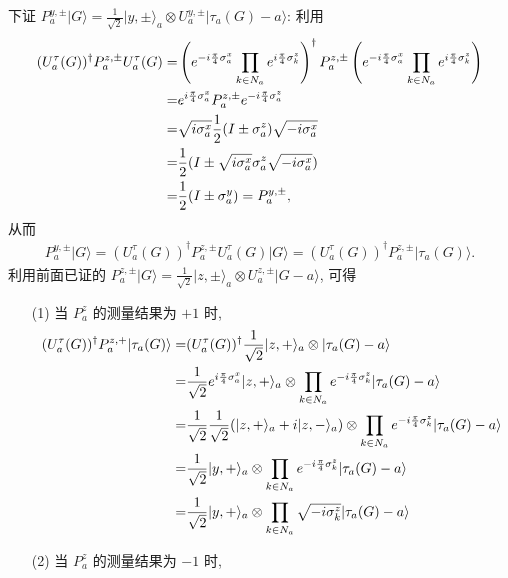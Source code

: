 \documentclass{assignment}
\begin{document}
\begin{pf}
    下证 $P_a^{y,\pm}\lvert G\rangle=\frac{1}{\sqrt{2}}\lvert y,\pm\rangle_a\otimes U_a^{y,\pm}\lvert\tau_a(G)-a\rangle$: 利用
    \begin{align}
        \notag(U_a^{\tau}(G))^{\dagger}P_a^{z,\pm}U_a^{\tau}(G)=&\left(e^{-i\frac{\pi}{4}\sigma_a^x}\prod_{k\in N_a}e^{i\frac{\pi}{4}\sigma_k^z}\right)^{\dagger}P_a^{z,\pm}\left(e^{-i\frac{\pi}{4}\sigma_a^x}\prod_{k\in N_a}e^{i\frac{\pi}{4}\sigma_k^z}\right)\\
        \notag=&e^{i\frac{\pi}{4}\sigma_a^x}P_a^{z,\pm}e^{-i\frac{\pi}{4}\sigma_a^z}\\
        \notag=&\sqrt{i\sigma_a^x}\frac{1}{2}(I\pm\sigma_a^z)\sqrt{-i\sigma_a^x}\\
        \notag=&\frac{1}{2}(I\pm\sqrt{i\sigma_a^x}\sigma_a^z\sqrt{-i\sigma_a^x})\\
        \notag=&\frac{1}{2}(I\pm\sigma_a^y)=P_a^{y,\pm},
    \end{align}
    从而
    \begin{align}
        P_a^{y,\pm}\lvert G\rangle=(U_a^{\tau}(G))^{\dagger}P_a^{z,\pm}U_a^{\tau}(G)\lvert G\rangle=(U_a^{\tau}(G))^{\dagger}P_a^{z,\pm}\lvert\tau_a(G)\rangle.
    \end{align}
    利用前面已证的 $P_a^{z,\pm}\lvert G\rangle=\frac{1}{\sqrt{2}}\lvert z,\pm\rangle_a\otimes U_a^{z,\pm}\lvert G-a\rangle$, 可得
    \begin{itemize}
        \item[(1)] 当 $P_a^z$ 的测量结果为 $+1$ 时,
        \begin{align}
            \notag(U_a^{\tau}(G))^{\dagger}P_a^{z,+}\lvert\tau_a(G)\rangle=&(U_a^{\tau}(G))^{\dagger}\frac{1}{\sqrt{2}}\lvert z,+\rangle_a\otimes\lvert\tau_a(G)-a\rangle\\
            \notag=&\frac{1}{\sqrt{2}}e^{i\frac{\pi}{4}\sigma_a^x}\lvert z,+\rangle_a\otimes\prod_{k\in N_a}e^{-i\frac{\pi}{4}\sigma_k^z}\lvert\tau_a(G)-a\rangle\\
            \notag=&\frac{1}{\sqrt{2}}\frac{1}{\sqrt{2}}(\lvert z,+\rangle_a+i\lvert z,-\rangle_a)\otimes\prod_{k\in N_a}e^{-i\frac{\pi}{4}\sigma_k^z}\lvert\tau_a(G)-a\rangle\\
            \notag=&\frac{1}{\sqrt{2}}\lvert y,+\rangle_a\otimes\prod_{k\in N_a}e^{-i\frac{\pi}{4}\sigma_k^z}\lvert\tau_a(G)-a\rangle\\
            =&\frac{1}{\sqrt{2}}\lvert y,+\rangle_a\otimes\prod_{k\in N_a}\sqrt{-i\sigma_k^z}\lvert\tau_a(G)-a\rangle
        \end{align}
        \item[(2)] 当 $P_a^z$ 的测量结果为 $-1$ 时,

\end{itemize}
\end{pf}
\end{document}
